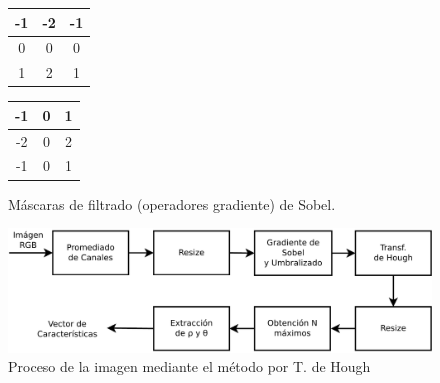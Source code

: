 \documentclass[conference,spanish,a4paper,10pt,oneside,final]{tfmpd}
\begin{document}
\begin{figure}
\begin{center}
\begin{tabular}{|c|c|c|}
\hline -1 & -2 & -1 \\\hline 0 & 0 & 0 \\\hline 1 & 2 & 1 \\\hline
\end{tabular}
\begin{tabular}{|c|c|c|}
\hline -1 & 0 & 1 \\\hline -2 & 0 & 2 \\\hline -1 & 0 & 1 \\\hline
\end{tabular}
\end{center}
\caption{Máscaras de filtrado (operadores gradiente) de Sobel.}
\label{masksobel}
\end{figure}


%

%
%
\begin{figure}
\begin{center}
\includegraphics[scale=0.25]{../diagramas/procesohough} 
\end{center}
\caption{Proceso de la imagen mediante el método por T. de Hough}
\label{procesohough}
\end{figure}
%
%
\end{document}
